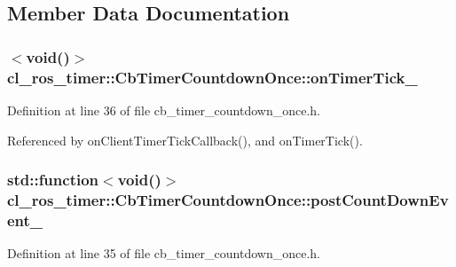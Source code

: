 \subsection{Member Data Documentation}
\subsubsection[{\texorpdfstring{on\+Timer\+Tick\+\_\+}{onTimerTick_}}]{$<$void()$>$ cl\+\_\+ros\+\_\+timer\+::\+Cb\+Timer\+Countdown\+Once\+::on\+Timer\+Tick\+\_\+\hspace{0.3cm}{\ttfamily [private]}}\hypertarget{classcl__ros__timer_1_1CbTimerCountdownOnce_ac948b5efd5c9a397319668378463eadd}{}\label{classcl__ros__timer_1_1CbTimerCountdownOnce_ac948b5efd5c9a397319668378463eadd}


Definition at line 36 of file cb\+\_\+timer\+\_\+countdown\+\_\+once.\+h.



Referenced by on\+Client\+Timer\+Tick\+Callback(), and on\+Timer\+Tick().

\subsubsection[{\texorpdfstring{post\+Count\+Down\+Event\+\_\+}{postCountDownEvent_}}]{\setlength{\rightskip}{0pt plus 5cm}std\+::function$<$void()$>$ cl\+\_\+ros\+\_\+timer\+::\+Cb\+Timer\+Countdown\+Once\+::post\+Count\+Down\+Event\+\_\+\hspace{0.3cm}{\ttfamily [private]}}\hypertarget{classcl__ros__timer_1_1CbTimerCountdownOnce_a5ab3b0a0aa38f28bc3091583d30fe003}{}\label{classcl__ros__timer_1_1CbTimerCountdownOnce_a5ab3b0a0aa38f28bc3091583d30fe003}


Definition at line 35 of file cb\+\_\+timer\+\_\+countdown\+\_\+once.\+h.



